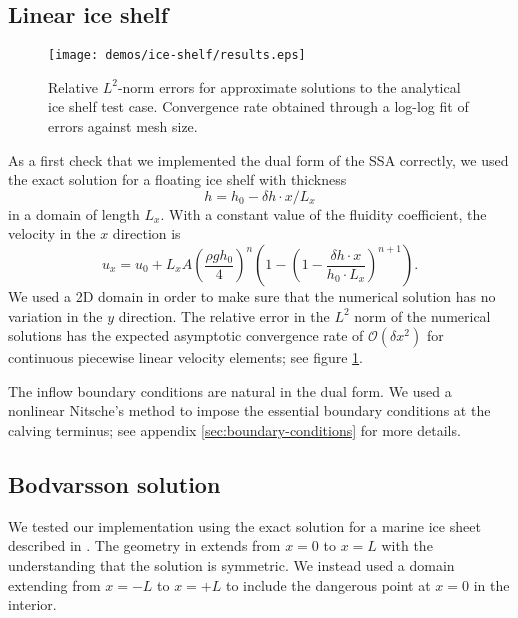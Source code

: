 \documentclass{article}
\theoremstyle{definition}
\theoremstyle{plain}
\begin{document}
\subsection{Linear ice shelf}

\begin{figure}[h]
    \begin{center}
        \texttt{[image: demos/ice-shelf/results.eps]}
    \end{center}
    \caption{Relative $L^2$-norm errors for approximate solutions to the analytical ice shelf test case.
    Convergence rate obtained through a log-log fit of errors against mesh size.}
    \label{fig:linear-ice-shelf-convergence-rate}
\end{figure}

As a first check that we implemented the dual form of the SSA correctly, we used the exact solution for a floating ice shelf with thickness
\begin{equation}
    h = h_0 - \delta h \cdot x / L_x
\end{equation}
in a domain of length $L_x$.
With a constant value of the fluidity coefficient, the velocity in the $x$ direction is
\begin{equation}
    u_x = u_0 + L_x A \left(\frac{\rho g h_0}{4}\right)^n\left(1 - \left(1 - \frac{\delta h \cdot x}{h_0\cdot L_x}\right)^{n + 1}\right).
\end{equation}
We used a 2D domain in order to make sure that the numerical solution has no variation in the $y$ direction.
The relative error in the $L^2$ norm of the numerical solutions has the expected asymptotic convergence rate of $\mathscr{O}(\delta x^2)$ for continuous piecewise linear velocity elements; see figure \ref{fig:linear-ice-shelf-convergence-rate}.

The inflow boundary conditions are natural in the dual form.
We used a nonlinear Nitsche's method to impose the essential boundary conditions at the calving terminus; see appendix \ref{sec:boundary-conditions} for more details.

\subsection{Bodvarsson solution}

We tested our implementation using the exact solution for a marine ice sheet described in \citet{bueler2014exact}.
The geometry in \citet{bueler2014exact} extends from $x = 0$ to $x = L$ with the understanding that the solution is symmetric.
We instead used a domain extending from $x = -L$ to $x = +L$ to include the dangerous point at $x = 0$ in the interior.
\end{document}
